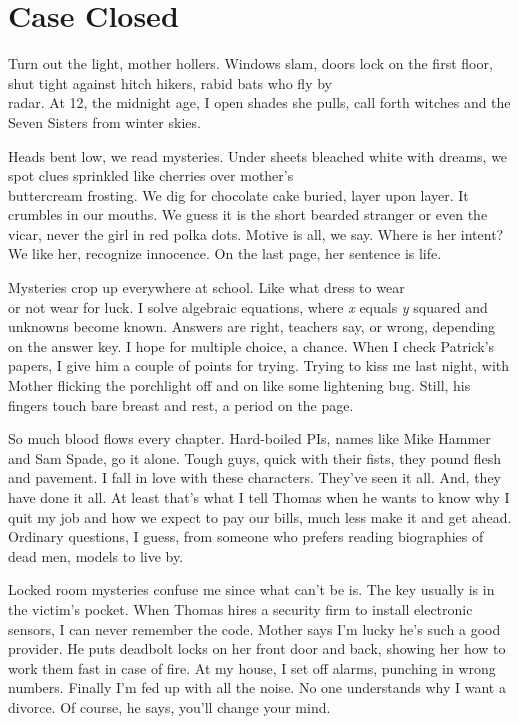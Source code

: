 \documentclass[twoside,10pt]{book}
\begin{document}
\clearpage
\section{Case Closed}

Turn out the light, mother hollers. Windows slam, doors lock on the
first floor, shut tight against hitch hikers, rabid bats who fly by\\
radar. At 12, the midnight age, I open shades she pulls, call forth
witches and the Seven Sisters from winter skies.

Heads bent low, we read mysteries. Under sheets bleached white with
dreams, we spot clues sprinkled like cherries over mother's\\
buttercream frosting. We dig for chocolate cake buried, layer upon
layer. It crumbles in our mouths. We guess it is the short bearded
stranger or even the vicar, never the girl in red polka dots. Motive is
all, we say. Where is her intent? We like her, recognize innocence. On
the last page, her sentence is life.

Mysteries crop up everywhere at school. Like what dress to wear\\
or not wear for luck. I solve algebraic equations, where \emph{x} equals
\emph{y} squared and unknowns become known. Answers are right, teachers
say, or wrong, depending on the answer key. I hope for multiple choice,
a chance. When I check Patrick's papers, I give him a couple of points
for trying. Trying to kiss me last night, with Mother flicking the
porchlight off and on like some lightening bug. Still, his fingers touch
bare breast and rest, a period on the page.

So much blood flows every chapter. Hard-boiled PIs, names like Mike
Hammer and Sam Spade, go it alone. Tough guys, quick with their fists,
they pound flesh and pavement. I fall in love with these characters.
They've seen it all. And, they have done it all. At least that's what I
tell Thomas when he wants to know why I quit my job and how we expect to
pay our bills, much less make it and get ahead. Ordinary questions, I
guess, from someone who prefers reading biographies of dead men, models
to live by.

Locked room mysteries confuse me since what can't be is. The key usually
is in the victim's pocket. When Thomas hires a security firm to install
electronic sensors, I can never remember the code. Mother says I'm lucky
he's such a good provider. He puts deadbolt locks on her front door and
back, showing her how to work them fast in case of fire. At my house, I
set off alarms, punching in wrong numbers. Finally I'm fed up with all
the noise. No one understands why I want a divorce. Of course, he says,
you'll change your mind.
\end{document}

